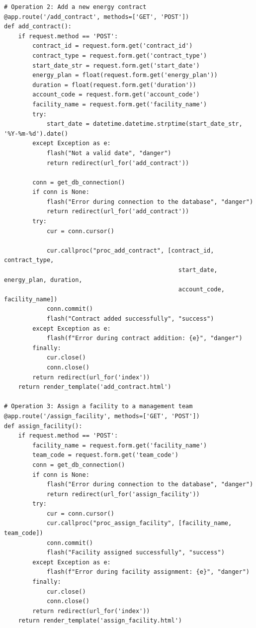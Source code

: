\begin{lstlisting}
# Operation 2: Add a new energy contract
@app.route('/add_contract', methods=['GET', 'POST'])
def add_contract():
    if request.method == 'POST':
        contract_id = request.form.get('contract_id')
        contract_type = request.form.get('contract_type')
        start_date_str = request.form.get('start_date')
        energy_plan = float(request.form.get('energy_plan'))
        duration = float(request.form.get('duration'))
        account_code = request.form.get('account_code')
        facility_name = request.form.get('facility_name')
        try:
            start_date = datetime.datetime.strptime(start_date_str, '%Y-%m-%d').date()
        except Exception as e:
            flash("Not a valid date", "danger")
            return redirect(url_for('add_contract'))

        conn = get_db_connection()
        if conn is None:
            flash("Error during connection to the database", "danger")
            return redirect(url_for('add_contract'))
        try:
            cur = conn.cursor()
           
            cur.callproc("proc_add_contract", [contract_id, contract_type,
                                                 start_date, energy_plan, duration,
                                                 account_code, facility_name])
            conn.commit()
            flash("Contract added successfully", "success")
        except Exception as e:
            flash(f"Error during contract addition: {e}", "danger")
        finally:
            cur.close()
            conn.close()
        return redirect(url_for('index'))
    return render_template('add_contract.html')

# Operation 3: Assign a facility to a management team
@app.route('/assign_facility', methods=['GET', 'POST'])
def assign_facility():
    if request.method == 'POST':
        facility_name = request.form.get('facility_name')
        team_code = request.form.get('team_code')
        conn = get_db_connection()
        if conn is None:
            flash("Error during connection to the database", "danger")
            return redirect(url_for('assign_facility'))
        try:
            cur = conn.cursor()
            cur.callproc("proc_assign_facility", [facility_name, team_code])
            conn.commit()
            flash("Facility assigned successfully", "success")
        except Exception as e:
            flash(f"Error during facility assignment: {e}", "danger")
        finally:
            cur.close()
            conn.close()
        return redirect(url_for('index'))
    return render_template('assign_facility.html')


\end{lstlisting}
